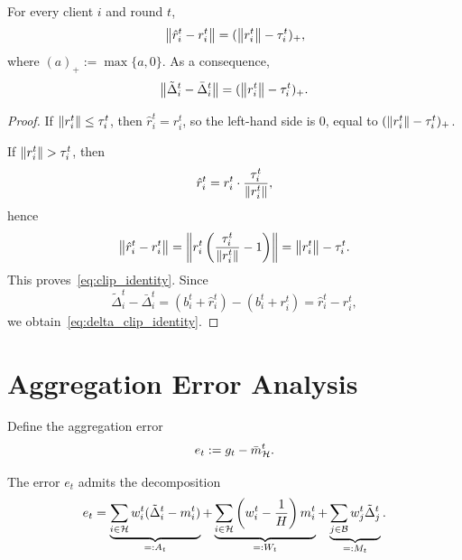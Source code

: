 \begin{lemma}
\label{lem:clip_identity}
For every client \(i\) and round \(t\),
\begin{equation}
    \left\lVert \hat{r}_i^t - r_i^t \right\rVert
    =
    (\left\lVert r_i^t \right\rVert - \tau_i^t)_+,
    \label{eq:clip_identity}
\end{equation}
where \((a)_+ := \max\{a,0\}\).
As a consequence,
\begin{equation}
    \left\lVert \tilde{\Delta}_i^t - \bar{\Delta}_i^t \right\rVert
    =
    (\left\lVert r_i^t \right\rVert - \tau_i^t)_+.
    \label{eq:delta_clip_identity}
\end{equation}
\end{lemma}

\begin{proof}
If \(\left\lVert r_i^t \right\rVert \le \tau_i^t\), then \(\hat{r}_i^t = r_i^t\), so the
left-hand side is \(0\), equal to
\((\left\lVert r_i^t \right\rVert-\tau_i^t)_+\).

If \(\left\lVert r_i^t \right\rVert > \tau_i^t\), then
\[
    \hat{r}_i^t = r_i^t \cdot \frac{\tau_i^t}{\left\lVert r_i^t \right\rVert},
\]
hence
\[
    \left\lVert \hat{r}_i^t - r_i^t \right\rVert
    =
    \left\|
        r_i^t\left(\frac{\tau_i^t}{\left\lVert r_i^t \right\rVert} - 1\right)
    \right\|
    =
    \left\lVert r_i^t \right\rVert - \tau_i^t.
\]
This proves~\eqref{eq:clip_identity}.
Since
\[
    \tilde{\Delta}_i^t - \bar{\Delta}_i^t
    =
    (b_i^t+\hat{r}_i^t) - (b_i^t+r_i^t)
    =
    \hat{r}_i^t-r_i^t,
\]
we obtain~\eqref{eq:delta_clip_identity}.
\end{proof}

\section{Aggregation Error Analysis}

Define the aggregation error
\begin{equation}
    e_t := g_t - \bar m_{\mathcal{H}}^t.
    \label{eq:e_t}
\end{equation}

\begin{lemma}
\label{lem:decomp}
The error \(e_t\) admits the decomposition
\begin{equation}
    e_t
    =
    \underbrace{
    \sum_{i \in \mathcal{H}} w_i^t(\tilde{\Delta}_i^t - m_i^t)
    }_{=:A_t}
    +
    \underbrace{
    \sum_{i \in \mathcal{H}}
    \left(w_i^t - \frac{1}{H}\right)m_i^t
    }_{=:W_t}
    +
    \underbrace{
    \sum_{j \in \mathcal{B}} w_j^t \tilde{\Delta}_j^t
    }_{=:M_t}.
    \label{eq:decomposition}
\end{equation}
\end{lemma}

